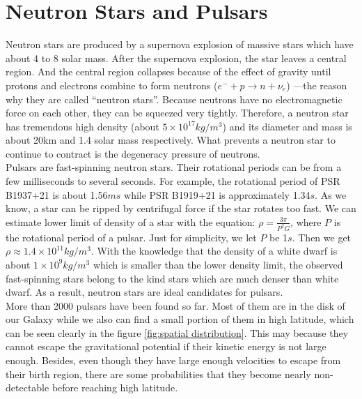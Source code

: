 \documentclass[12pt]{report}
\begin{document}
    \section{Neutron Stars and Pulsars}
        Neutron stars are produced by a supernova explosion of massive stars which have about 4 to 8 
        solar mass. After 
        the supernova explosion, the star leaves a central region. And the central region collapses because 
        of the effect of 
        gravity until protons and electrons combine to form neutrons ($e^{-}+p\rightarrow n+\nu_{e}$)
        ---the reason why they are called 
        ``neutron stars''.  
        Because neutrons have no electromagnetic force on each other, they can be squeezed very tightly. 
        Therefore, a neutron  
        star has tremendous high density (about $5\times 10^{17} kg/m^3$) and its diameter and mass is about
        20km and 
        1.4 solar mass respectively. What
        prevents a neutron star to continue to contract is the degeneracy pressure of neutrons. \\
        \indent Pulsars are fast-spinning neutron stars. Their rotational periods can be from a few 
        milliseconds
        to several seconds. For example, the rotational period of PSR B1937+21 is about 1.56$ms$ while 
        PSR B1919+21 is approximately 1.34$s$. As we know, a star can be ripped by centrifugal force if the
        star rotates too fast. We can estimate lower limit of density of a star with the equation: 
        $\rho=\frac{3\pi}{P^2G}$, where $P$ is the rotational period of a pulsar. Just for simplicity, we
        let $P$ be 1$s$. Then we get $\rho\approx 1.4\times 10^{11}kg/m^3$. With the knowledge  that the 
        density of a white dwarf is about $1\times 10^9kg/m^3$ which is smaller than the lower density limit,
        the observed fast-spinning stars belong to the kind stars which are much denser 
        than white dwarf. As a result, neutron stars are ideal candidates for pulsars. \\
        \indent 
        More than 2000 pulsars have been found so far. Most of them are in the disk of our Galaxy while we also can 
        find a small portion of them in high latitude, which can be seen clearly in the figure \ref{fig:spatial 
        distribution}. This may 
        because they cannot escape the gravitational potential if their kinetic energy is not large enough. Besides,
        even though they have large enough velocities to escape from their birth region, there are some 
        probabilities that they become nearly non-detectable before reaching high latitude. 
        
\end{document}
